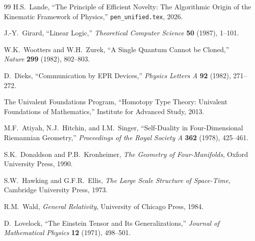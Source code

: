 \documentclass[12pt,a4paper]{article}
\theoremstyle{definition}
\begin{document}
\begin{thebibliography}{99}
H.S.~Lande, ``The Principle of Efficient Novelty: The Algorithmic Origin of the Kinematic Framework of Physics,'' \texttt{pen\_unified.tex}, 2026.

J.-Y.~Girard, ``Linear Logic,'' \emph{Theoretical Computer Science} \textbf{50} (1987), 1--101.

W.K.~Wootters and W.H.~Zurek, ``A Single Quantum Cannot be Cloned,'' \emph{Nature} \textbf{299} (1982), 802--803.

D.~Dieks, ``Communication by EPR Devices,'' \emph{Physics Letters A} \textbf{92} (1982), 271--272.

The Univalent Foundations Program, ``Homotopy Type Theory: Univalent Foundations of Mathematics,'' Institute for Advanced Study, 2013.

M.F.~Atiyah, N.J.~Hitchin, and I.M.~Singer, ``Self-Duality in Four-Dimensional Riemannian Geometry,'' \emph{Proceedings of the Royal Society A} \textbf{362} (1978), 425--461.

S.K.~Donaldson and P.B.~Kronheimer, \emph{The Geometry of Four-Manifolds}, Oxford University Press, 1990.

S.W.~Hawking and G.F.R.~Ellis, \emph{The Large Scale Structure of Space-Time}, Cambridge University Press, 1973.

R.M.~Wald, \emph{General Relativity}, University of Chicago Press, 1984.

D.~Lovelock, ``The Einstein Tensor and Its Generalizations,'' \emph{Journal of Mathematical Physics} \textbf{12} (1971), 498--501.
\end{thebibliography}
\end{document}
